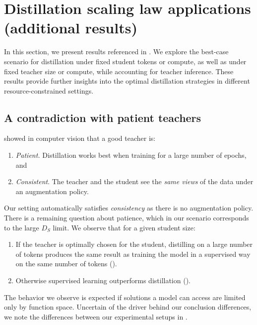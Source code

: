\newcommand{\bigwidth}{0.79\textwidth}


\section{Distillation scaling law applications (additional results)}
\label{sec:distillation-scaling-law-applications-extra-results}

In this section, we present results referenced in . We explore the best-case scenario for distillation under fixed student tokens or compute, as well as under fixed teacher size or compute, while accounting for teacher inference. These results provide further insights into the optimal distillation strategies in different resource-constrained settings.

\subsection{A contradiction with patient teachers}
\label{sec:contradiction}
\citet{DBLP:conf/cvpr/BeyerZRMA022}
showed in computer vision that a good teacher is:
\begin{enumerate}
    \item \emph{Patient.} Distillation works best when training for a large number of epochs, and
    \item \emph{Consistent}. The teacher and the student see the \emph{same views} of the data under an augmentation policy.
\end{enumerate}
Our setting automatically satisfies \emph{consistency} as there is no augmentation policy.
There is a remaining question about patience, which in our scenario corresponds to the large $D_S$ limit.
We observe that for a given student size:
\begin{enumerate}
    \item If the teacher is optimally chosen for the student, distilling on a large number of tokens produces the same result as training the model in a supervised way on the same number of tokens ().
    \item Otherwise supervised learning outperforms distillation ().
\end{enumerate}
The behavior we observe is expected if solutions a model can access are limited only by function space.
Uncertain of the driver behind our conclusion differences,
we note the differences between our experimental setups in .
